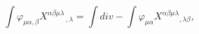 \begin{equation}
\int \varphi_{\mu\alpha ,\beta} X^{\alpha\beta\mu\lambda}{}_{\, ,\lambda} = \int
div - \int \varphi_{\mu\alpha} X^{\alpha\beta\mu\lambda}{}_{ ,\lambda \beta},
\end{equation}

